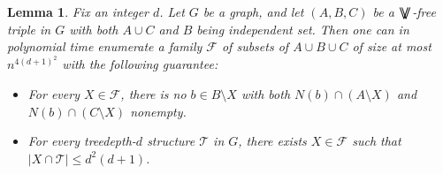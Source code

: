 \documentclass[11pt,a4paper]{article}
\newtheorem{lemma}[theorem]{Lemma}
\theoremstyle{definition}
\def\T{\mathcal{T}}
\newcommand{\VV}{$\bigvee\mkern-15mu\bigvee$}
\begin{document}
\begin{lemma}\label{lem:bip-cleaning}
Fix an integer $d$.
Let $G$ be a graph, and let $(A,B,C)$ be a \VV-free
triple in $G$ with both $A \cup C$ and $B$ being independent set. Then one can in polynomial time enumerate a family $\mathcal{F}$ of subsets of $A \cup B \cup C$ of 
size at most $n^{4(d+1)^2}$ with the following guarantee:
\begin{itemize}
    \item For every $X \in \mathcal{F}$, there is no $b \in B \setminus X$ 
    with both $N(b) \cap (A \setminus X)$ and $N(b) \cap (C \setminus X)$ nonempty.
    \item For every treedepth-$d$ structure $\T$ in $G$, there exists $X \in \mathcal{F}$
    such that $|X \cap \T| \leq d^2(d+1)$.
\end{itemize}
\end{lemma}
\end{document}
